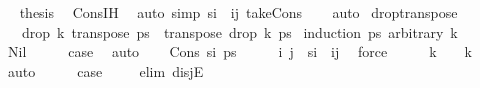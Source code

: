 \begin{isabellebody}
\ \isamarkupfalse%
\ {\isacharquery}{\kern0pt}thesis\ \isamarkupfalse%
\ Cons{\isachardot}{\kern0pt}IH\ \isamarkupfalse%
\ {\isacharparenleft}{\kern0pt}auto\ simp{\isacharcolon}{\kern0pt}\ {\isacartoucheopen}s\isactrlsub i\ {\isacharequal}{\kern0pt}\ {\isacharparenleft}{\kern0pt}i{\isacharcomma}{\kern0pt}j{\isacharparenright}{\kern0pt}{\isacartoucheclose}\ take{\isacharunderscore}{\kern0pt}Cons{\isacharprime}{\kern0pt}{\isacharparenright}{\kern0pt}\isanewline
\ \ \isamarkupfalse%
\ auto\isanewline
{}\isamarkupfalse%
%
\endisatagproof
{\isafoldproof}%
%
\isadelimproof
\isanewline
%
\endisadelimproof
\isanewline
{}\isamarkupfalse%
\ drop{\isacharunderscore}{\kern0pt}transpose{\isacharcolon}{\kern0pt}\ \isanewline
\ \ \ {\isachardoublequoteopen}drop\ k\ {\isacharparenleft}{\kern0pt}transpose\ ps{\isacharparenright}{\kern0pt}\ {\isacharequal}{\kern0pt}\ transpose\ {\isacharparenleft}{\kern0pt}drop\ k\ ps{\isacharparenright}{\kern0pt}{\isachardoublequoteclose}\isanewline
%
\isadelimproof
%
\endisadelimproof
%
\isatagproof
{}\isamarkupfalse%
\ {\isacharparenleft}{\kern0pt}induction\ ps\ arbitrary{\isacharcolon}{\kern0pt}\ k{\isacharparenright}{\kern0pt}\isanewline
\ \ \isamarkupfalse%
\ Nil\isanewline
\ \ \isamarkupfalse%
\ \isamarkupfalse%
\ {\isacharquery}{\kern0pt}case\ \isamarkupfalse%
\ auto\isanewline
{}\isamarkupfalse%
\isanewline
\ \ \isamarkupfalse%
\ {\isacharparenleft}{\kern0pt}Cons\ s\isactrlsub i\ ps{\isacharparenright}{\kern0pt}\isanewline
\ \ \isamarkupfalse%
\ \isamarkupfalse%
\ i\ j\ \ {\isachardoublequoteopen}s\isactrlsub i\ {\isacharequal}{\kern0pt}\ {\isacharparenleft}{\kern0pt}i{\isacharcomma}{\kern0pt}j{\isacharparenright}{\kern0pt}{\isachardoublequoteclose}\ \isamarkupfalse%
\ force\isanewline
\ \ \isamarkupfalse%
\ \isamarkupfalse%
\ {\isachardoublequoteopen}k\ {\isacharequal}{\kern0pt}\ {}\ {\isasymor}\ k\ {\isachargreater}{\kern0pt}\ {}{\isachardoublequoteclose}\ \isamarkupfalse%
\ auto\isanewline
\ \ \isamarkupfalse%
\ \isamarkupfalse%
\ {\isacharquery}{\kern0pt}case\ \isanewline
\ \ \isamarkupfalse%
\ {\isacharparenleft}{\kern0pt}elim\ disjE{\isacharparenright}{\kern0pt}\isanewline
\ \ \ \ \isamarkupfalse%

\end{isabellebody}
